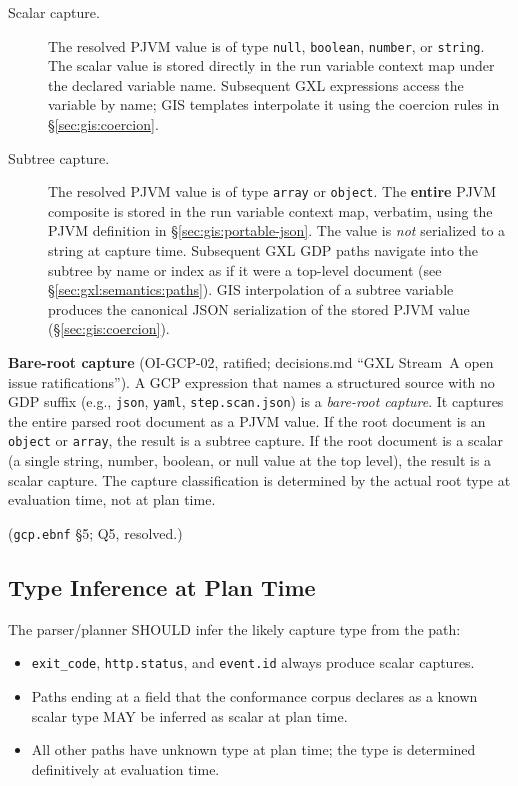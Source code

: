 \begin{description}
  \item[Scalar capture.]
    The resolved PJVM value is of type \texttt{null}, \texttt{boolean},
    \texttt{number}, or \texttt{string}.
    The scalar value is stored directly in the run variable context map
    under the declared variable name.
    Subsequent GXL expressions access the variable by name;
    GIS templates interpolate it using the coercion rules in
    \S\ref{sec:gis:coercion}.

  \item[Subtree capture.]
    The resolved PJVM value is of type \texttt{array} or \texttt{object}.
    The \textbf{entire} PJVM composite is stored in the run variable context
    map, verbatim, using the PJVM definition in \S\ref{sec:gis:portable-json}.
    The value is \emph{not} serialized to a string at capture time.
    Subsequent GXL GDP paths navigate into the subtree by name or index
    as if it were a top-level document (see \S\ref{sec:gxl:semantics:paths}).
    GIS interpolation of a subtree variable produces the canonical JSON
    serialization of the stored PJVM value (\S\ref{sec:gis:coercion}).
\end{description}

\noindent\textbf{Bare-root capture} (OI-GCP-02, ratified;
decisions.md ``GXL Stream~A open issue ratifications'').
A GCP expression that names a structured source with no GDP suffix
(e.g., \texttt{json}, \texttt{yaml}, \texttt{step.scan.json}) is a
\emph{bare-root capture}.
It captures the entire parsed root document as a PJVM value.
If the root document is an \texttt{object} or \texttt{array},
the result is a subtree capture.
If the root document is a scalar (a single string, number, boolean, or
null value at the top level), the result is a scalar capture.
The capture classification is determined by the actual root type at
evaluation time, not at plan time.

(\texttt{gcp.ebnf} \S5; Q5, resolved.)

\subsection{Type Inference at Plan Time}
\label{subsec:gcp:subtree:inference}

The parser/planner SHOULD infer the likely capture type from the path:

\begin{itemize}
  \item \texttt{exit\_code}, \texttt{http.status}, and \texttt{event.id}
    always produce scalar captures.
  \item Paths ending at a field that the conformance corpus declares as
    a known scalar type MAY be inferred as scalar at plan time.
  \item All other paths have unknown type at plan time; the type is
    determined definitively at evaluation time.
\end{itemize}

